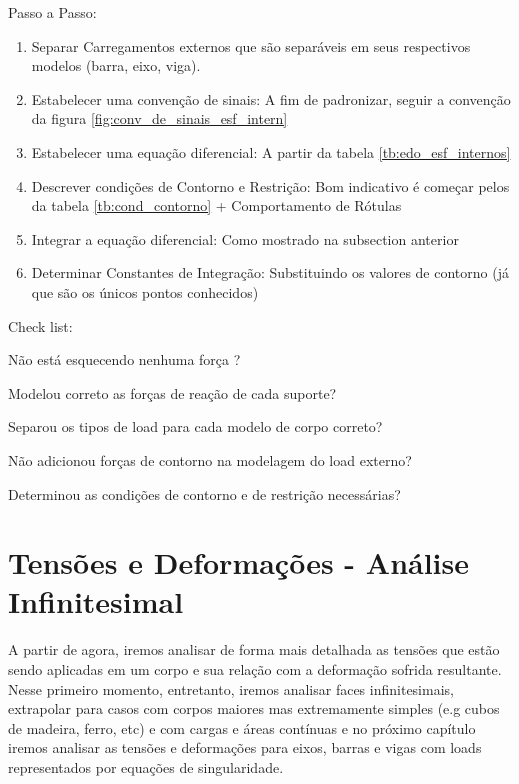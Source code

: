 \documentclass{article}
\begin{document}
\begin{minipage}[t]{.7\textwidth}
    Passo a Passo:
    \begin{enumerate}\addtocounter{enumi}{-1}\tiny
        \item Separar Carregamentos externos que são separáveis em seus respectivos modelos (barra, eixo, viga).
        \item Estabelecer uma convenção de sinais: A fim de padronizar, seguir a convenção da figura \ref{fig:conv_de_sinais_esf_intern}
        \item Estabelecer uma equação diferencial: A partir da tabela \ref{tb:edo_esf_internos}
        \item Descrever condições de Contorno e Restrição: Bom indicativo é começar pelos da tabela \ref{tb:cond_contorno} + Comportamento de Rótulas
        \item Integrar a equação diferencial: Como mostrado na subsection anterior
        \item Determinar Constantes de Integração: Substituindo os valores de contorno (já que são os únicos pontos conhecidos)
    \end{enumerate}
\end{minipage}\hfill
\begin{minipage}[t]{.3\textwidth}
    Check list:
    \begin{todolist}\tiny
        \item Não está esquecendo nenhuma força ?
        \item Modelou correto as forças de reação de cada suporte?
        \item Separou os tipos de load para cada modelo de corpo correto?
        \item Não adicionou forças de contorno na modelagem do load externo?
        \item Determinou as condições de contorno e de restrição necessárias?
    \end{todolist}
\end{minipage}


\section{Tensões e Deformações - Análise Infinitesimal}
A partir de agora, iremos analisar de forma mais detalhada as tensões que estão sendo aplicadas em um corpo e sua relação com
a deformação sofrida resultante. Nesse primeiro momento, entretanto, iremos analisar faces infinitesimais, extrapolar para casos com corpos maiores mas extremamente simples (e.g cubos de madeira, ferro, etc) e com cargas e áreas contínuas
e no próximo capítulo iremos analisar as tensões e deformações para eixos, barras e vigas com loads representados por equações de singularidade.
\end{document}

